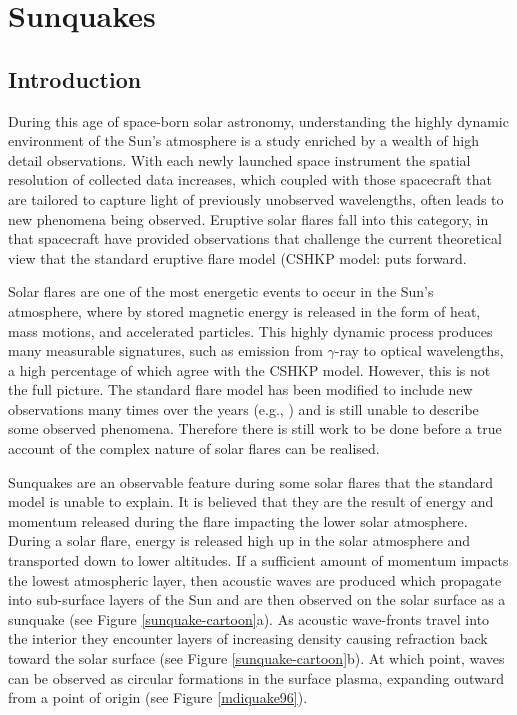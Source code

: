 \section{Sunquakes}
\subsection{Introduction}


During this age of space-born solar astronomy, understanding the highly dynamic environment of the Sun's atmosphere is a study enriched by a wealth of high detail observations. With each newly launched space instrument the spatial resolution of collected data increases, which coupled with those spacecraft that are tailored to capture light of previously unobserved wavelengths, often leads to new phenomena being observed. Eruptive solar flares fall into this category, in that spacecraft have provided observations that challenge the current theoretical view that the standard eruptive flare model (CSHKP model: \citep{1964NASSP..50..451C, 1966Natur.211..695S, 1974SoPh...34..323H, 1976SoPh...50...85K} puts forward. 

Solar flares are one of the most energetic events to occur in the Sun's atmosphere, where by stored magnetic energy is released in the form of heat, mass motions, and accelerated particles. This highly dynamic process produces many measurable signatures, such as emission from $\gamma$-ray to optical wavelengths, a high percentage of which agree with the CSHKP model. However, this is not the full picture. The standard flare model has been modified to include new observations many times over the years (e.g., \cite{2011LRSP....8....6S}) and is still unable to describe some observed phenomena. Therefore there is still work to be done before a true account of the complex nature of solar flares can be realised.    

Sunquakes are an observable feature during some solar flares that the standard model is unable to explain. It is believed that they are the result of energy and momentum released during the flare impacting the lower solar atmosphere. During a solar flare, energy is released high up in the solar atmosphere and transported down to lower altitudes. If a sufficient amount of momentum impacts the lowest atmospheric layer, then acoustic waves are produced which propagate into sub-surface layers of the Sun and are then observed on the solar surface as a sunquake (see Figure \ref{sunquake-cartoon}a). As acoustic wave-fronts travel into the interior they encounter layers of increasing density causing refraction back toward the solar surface (see Figure \ref{sunquake-cartoon}b). At which point, waves can be observed as circular formations in the surface plasma, expanding outward from a point of origin (see Figure \ref{mdiquake96}). 


